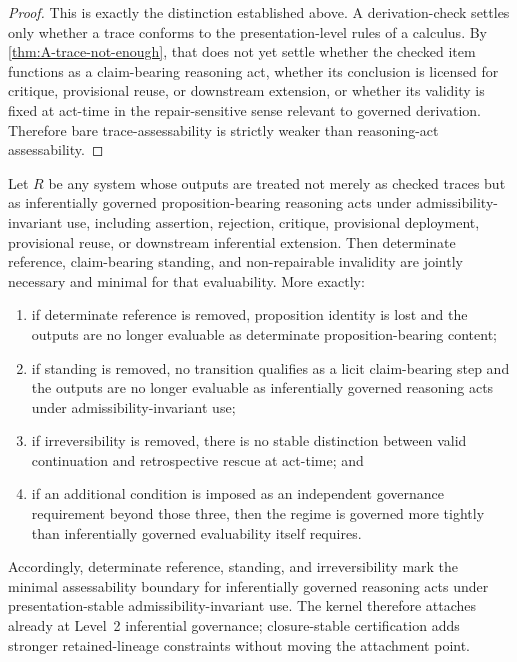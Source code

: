 \begin{proof}
This is exactly the distinction established above. A derivation-check settles only whether a trace
conforms to the presentation-level rules of a calculus. By \cref{thm:A-trace-not-enough}, that
does not yet settle whether the checked item functions as a claim-bearing reasoning act, whether
its conclusion is licensed for critique, provisional reuse, or downstream extension, or whether its validity is fixed at act-time in
the repair-sensitive sense relevant to governed derivation. Therefore bare trace-assessability is
strictly weaker than reasoning-act assessability.
\end{proof}

\begin{theorem}
\label{thm:A-assessability}
Let $R$ be any system whose outputs are treated not merely as checked traces but as inferentially governed proposition-bearing
reasoning acts under admissibility-invariant use, including assertion, rejection, critique, provisional deployment, provisional reuse, or downstream inferential extension. Then
determinate reference, claim-bearing standing, and non-repairable invalidity are jointly necessary
and minimal for that evaluability. More exactly:
\begin{enumerate}[label=(\roman*), leftmargin=2.5em]
    \item if determinate reference is removed, proposition identity is lost and the outputs are no
    longer evaluable as determinate proposition-bearing content;
    \item if standing is removed, no transition qualifies as a licit claim-bearing step and the outputs
    are no longer evaluable as inferentially governed reasoning acts under admissibility-invariant use;
    \item if irreversibility is removed, there is no stable distinction between valid continuation and
    retrospective rescue at act-time; and
    \item if an additional condition is imposed as an independent governance requirement beyond
    those three, then the regime is governed more tightly than inferentially governed evaluability itself
    requires.
\end{enumerate}
Accordingly, determinate reference, standing, and irreversibility mark the minimal assessability
boundary for inferentially governed reasoning acts under presentation-stable admissibility-invariant use. The kernel therefore attaches already at Level~2 inferential governance; closure-stable certification adds stronger retained-lineage constraints without moving the attachment point.
\end{theorem}

